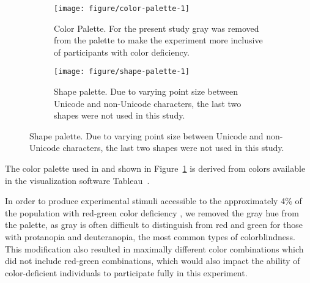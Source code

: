 \documentclass[12pt]{article}\usepackage[]{graphicx}\usepackage[]{color}
\newenvironment{knitrout}{}{} %
\newcommand{\comment}[2][inline]{\todo[color=SkyBlue, #1]{#2}} %
\begin{document}
\begin{figure}[bhtp]\centering
\caption{Color and shape palettes investigated for differentiability in \protect\citet{heer:2014}. }
\begin{subfigure}[t]{0.475\textwidth}
\begin{knitrout}
\color{fgcolor}

{\centering \texttt{[image: figure/color-palette-1]} 

}



\end{knitrout}
\caption[Color palette used to maximize preattentive perception]{Color Palette. For the present study  gray was removed from the palette to make the experiment more inclusive of participants with color deficiency.\label{fig:colors}}
\end{subfigure}
\hfill
\begin{subfigure}[t]{0.475\textwidth}
\begin{knitrout}
\color{fgcolor}

{\centering \texttt{[image: figure/shape-palette-1]} 

}



\end{knitrout}
\caption[Shape palette used to maximize preattentive perception]{Shape palette. Due to varying point size between Unicode and non-Unicode characters, the last two shapes were not used in this study.\label{fig:shapes}}
\end{subfigure}
\end{figure}

The color palette used in \citet{heer:2014} and shown in Figure~\ref{fig:colors} is derived from colors available in the visualization software Tableau~\citep{tableau}. 

In order to produce experimental stimuli accessible to the approximately 4\% of the population with red-green color deficiency \citep{colorvision}, we removed the gray hue from the palette, as gray is often difficult to distinguish from red and green for those with protanopia and deuteranopia, the most common types of colorblindness. This modification also resulted in maximally different color combinations which did not include red-green combinations, which would also impact the ability of color-deficient individuals to participate fully in this experiment.  
\end{document}
